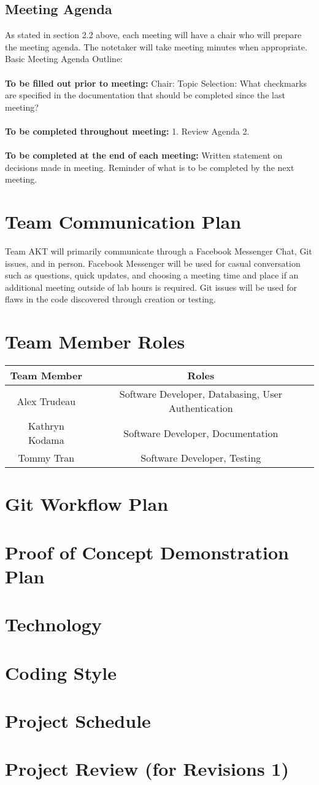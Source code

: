 \documentclass[12pt,fleqn]{article}
\begin{document}
\subsection{Meeting Agenda}
As stated in section 2.2 above, each meeting will have a chair who will prepare the meeting agenda.  The notetaker will take meeting minutes when appropriate.  \\ 
Basic Meeting Agenda Outline: \\ \\
\textbf{To be filled out prior to meeting:}
Chair:
Topic Selection: What checkmarks are specified in the documentation that should be completed since the last meeting? 
\\ \\
\textbf{To be completed throughout meeting:}
1. Review Agenda
2. 
\\ \\
\textbf{To be completed at the end of each meeting:}
Written statement on decisions made in meeting.
Reminder of what is to be completed by the next meeting.

\section {Team Communication Plan}
Team AKT will primarily communicate through a Facebook Messenger Chat, Git issues, and in person.  Facebook Messenger will be used for casual conversation such as questions, quick updates, and choosing a meeting time and place if an additional meeting outside of lab hours is required. Git issues will be used for flaws in the code discovered through creation or testing.

\section {Team Member Roles}
\begin{tabular}{ | c | c | }
\hline 
\textbf{Team Member} & \textbf{Roles} \\
\hline
Alex Trudeau & Software Developer, Databasing, User Authentication \\
\hline 
Kathryn Kodama & Software Developer, Documentation \\
\hline
Tommy Tran & Software Developer, Testing \\
\hline

\end{tabular}

\section {Git Workflow Plan}
\section {Proof of Concept Demonstration Plan}
\section {Technology}
\section {Coding Style}
\section {Project Schedule}
\section {Project Review (for Revisions 1)}
\end{document}

